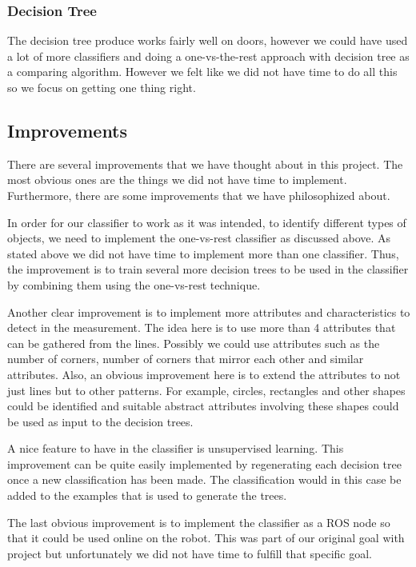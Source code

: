 \documentclass[a4paper, 10pt, conference]{ieeeconf}      %
\begin{document}
\subsubsection{Decision Tree}
The decision tree produce works fairly well on doors, however we could have used a lot of more classifiers and doing a one-vs-the-rest approach with decision tree as a comparing algorithm. However we felt like we did not have time to do all this so we focus on getting one thing right.

\subsection{Improvements}
There are several improvements that we have thought about in this project. The most obvious ones are the things we did not have time to implement. Furthermore, there are some improvements that we have philosophized about.

In order for our classifier to work as it was intended, to identify different types of objects, we need to implement the one-vs-rest classifier as discussed above. As stated above we did not have time to implement more than one classifier. Thus, the improvement is to train several more decision trees to be used in the classifier by combining them using the one-vs-rest technique.

Another clear improvement is to implement more attributes and characteristics to detect in the measurement. The idea here is to use more than 4 attributes that can be gathered from the lines. Possibly we could use attributes such as the number of corners, number of corners that mirror each other and similar attributes. Also, an obvious improvement here is to extend the attributes to not just lines but to other patterns. For example, circles, rectangles and other shapes could be identified and suitable abstract attributes involving these shapes could be used as input to the decision trees.

A nice feature to have in the classifier is unsupervised learning. This improvement can be quite easily implemented by regenerating each decision tree once a new classification has been made. The classification would in this case be added to the examples that is used to generate the trees.

The last obvious improvement is to implement the classifier as a ROS node so that it could be used online on the robot. This was part of our original goal with project but unfortunately we did not have time to fulfill that specific goal.
\end{document}
